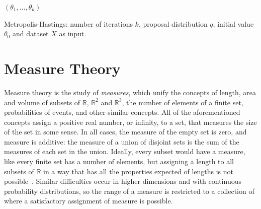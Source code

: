 \documentclass[english,twoside,openright]{HYgraduMLDS}
\newcommand{\R}{\mathbb{R}}
\begin{document}
\begin{algorithm}[H]\label{MH_algo}
    \SetAlgoLined
    \Return \((\theta_1, \dotsc, \theta_k)\)
    \caption{
        Metropolis-Hastings: number of iterations \(k\), proposal 
        distribution \(q\), initial value \(\theta_0\) and
        dataset \(X\) as input.
    }
\end{algorithm}

\section{Measure Theory}

Measure theory is the study of \emph{measures}, which unify the concepts
of length, area and volume of subsets of \(\R\), \(\R^{2}\) and
\(\R^{3}\), the number of elements of a finite set, probabilities of events,
and other similar
concepts. All of the aforementioned concepts assign a positive real number,
or infinity, to a set, that measures the size of the set in some sense.
In all cases, the measure of the empty set is zero, and measure is
additive: the measure of a union of disjoint sets is the sum of the measures
of each set in the union. Ideally, every subset would have a measure, like
every finite set has a number of elements, but assigning a
length to all subsets of \(\R\) in a way that has all the properties expected
of lengths
is not possible~\cite{Cin11}. Similar difficulties occur in higher dimensions and with
continuous probability distributions, so the range of a measure is
restricted to a collection of where a satisfactory assignment of measure is
possible.
\end{document}
